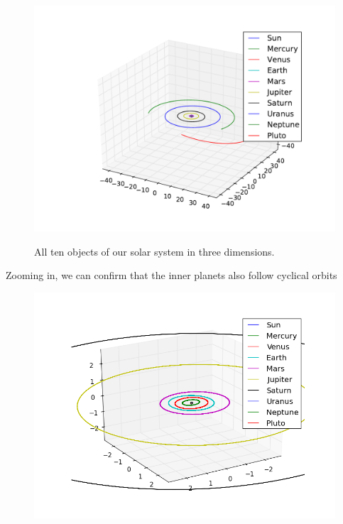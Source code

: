 \documentclass[10pt]{article}
\begin{document}
\begin{multicols}{2}
\begin{figure}[H]
    \centering
    \includegraphics[width=1.0\linewidth]{../results/full_system.pdf}
    \label{fig:name}
    \caption{All ten objects of our solar system in three dimensions.}
\end{figure}

Zooming in, we can confirm that the inner planets also follow cyclical
orbits


\begin{figure}[H]
    \centering
    \includegraphics[width=1.0\linewidth]{../results/full_system_inner.png}
    \label{fig:name}
\end{figure}






\end{multicols}
\end{document}
